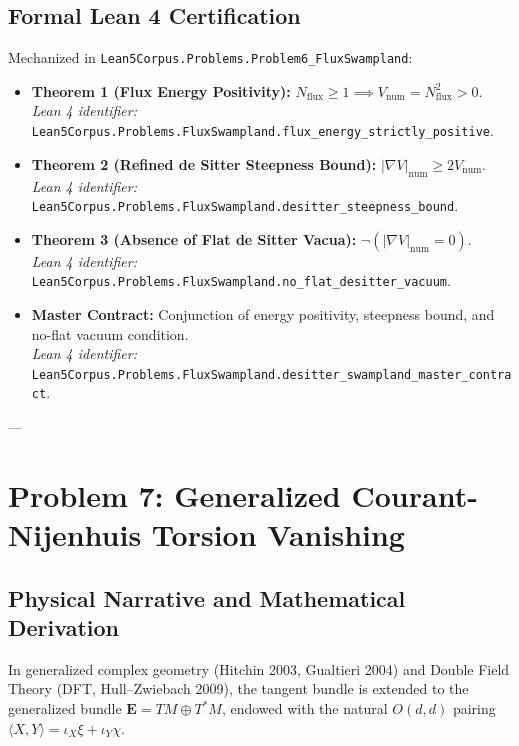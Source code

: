 \documentclass[11pt,a4paper]{article}
\begin{document}
\subsection{Formal Lean 4 Certification}
Mechanized in \texttt{Lean5Corpus.Problems.Problem6\_FluxSwampland}:
\begin{itemize}
    \item \textbf{Theorem 1 (Flux Energy Positivity):} $N_{\mathrm{flux}} \ge 1 \implies V_{\mathrm{num}} = N_{\mathrm{flux}}^2 > 0$. \\
    \textit{Lean 4 identifier:} \texttt{Lean5Corpus.Problems.FluxSwampland.flux\_energy\_strictly\_positive}.
    \item \textbf{Theorem 2 (Refined de Sitter Steepness Bound):} $|\nabla V|_{\mathrm{num}} \ge 2 V_{\mathrm{num}}$. \\
    \textit{Lean 4 identifier:} \texttt{Lean5Corpus.Problems.FluxSwampland.desitter\_steepness\_bound}.
    \item \textbf{Theorem 3 (Absence of Flat de Sitter Vacua):} $\neg (|\nabla V|_{\mathrm{num}} = 0)$. \\
    \textit{Lean 4 identifier:} \texttt{Lean5Corpus.Problems.FluxSwampland.no\_flat\_desitter\_vacuum}.
    \item \textbf{Master Contract:} Conjunction of energy positivity, steepness bound, and no-flat vacuum condition. \\
    \textit{Lean 4 identifier:} \texttt{Lean5Corpus.Problems.FluxSwampland.desitter\_swampland\_master\_contract}.
\end{itemize}

---

\section{Problem 7: Generalized Courant-Nijenhuis Torsion Vanishing}

\subsection{Physical Narrative and Mathematical Derivation}
In generalized complex geometry (Hitchin 2003, Gualtieri 2004) and Double Field Theory (DFT, Hull--Zwiebach 2009), the tangent bundle is extended to the generalized bundle $\mathbf{E} = TM \oplus T^*M$, endowed with the natural $O(d,d)$ pairing $\langle X, Y \rangle = \iota_X \xi + \iota_Y \chi$. 
\end{document}
